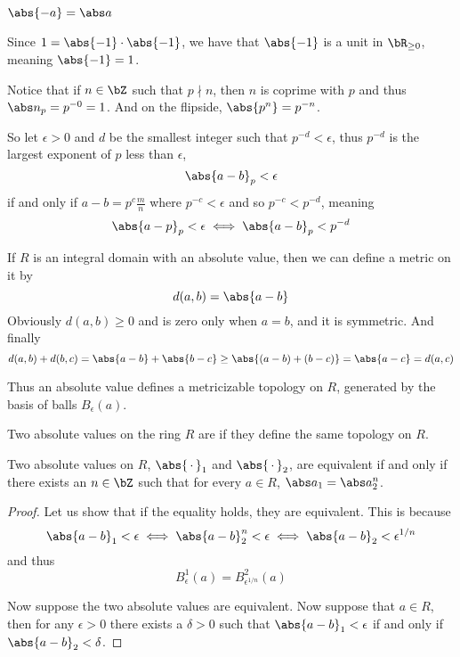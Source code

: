 \documentclass[10pt]{article}
\begin{document}
\begin{prop*}

    $\abs{-a}=\abs a$

\end{prop*}

Since $1=\abs{-1}\cdot\abs{-1}$, we have that $\abs{-1}$ is a unit in $\bR_{\geq0}$, meaning $\abs{-1}=1$.

Notice that if $n\in\bZ$ such that $p\nmid n$, then $n$ is coprime with $p$ and thus $\abs n_p=p^{-0}=1$.
And on the flipside, $\abs{p^n} = p^{-n}$.

So let $\epsilon>0$ and $d$ be the smallest integer such that $p^{-d}<\epsilon$, thus $p^{-d}$ is the largest exponent of $p$ less than $\epsilon$,
\[ \abs{a-b}_p < \epsilon \]
if and only if $a-b=p^c\frac mn$ where $p^{-c}<\epsilon$ and so $p^{-c}<p^{-d}$, meaning
\[ \abs{a-p}_p < \epsilon \iff \abs{a-b}_p < p^{-d} \]

\begin{note*}

    If $R$ is an integral domain with an absolute value, then we can define a metric on it by
    \[ d(a,b) = \abs{a-b} \]
    Obviously $d(a,b)\geq0$ and is zero only when $a=b$, and it is symmetric.
    And finally
    \[ d(a,b) + d(b,c) = \abs{a-b} + \abs{b-c} \geq \abs{(a-b)+(b-c)} = \abs{a-c} = d(a,c) \]

    Thus an absolute value defines a metricizable topology on $R$, generated by the basis of balls $B_\epsilon(a)$.

\end{note*}

\begin{defn*}

    Two absolute values on the ring $R$ are  if they define the same topology on $R$.

\end{defn*}

\begin{prop*}

    Two absolute values on $R$, $\abs{\,\cdot\,}_1$ and $\abs{\,\cdot\,}_2$, are equivalent if and only if there exists an $n\in\bZ$ such that for every $a\in R$, $\abs a_1=\abs a_2^n$.

\end{prop*}

\begin{proof}

    Let us show that if the equality holds, they are equivalent.
    This is because
    \[ \abs{a-b}_1 < \epsilon \iff \abs{a-b}_2^n < \epsilon \iff \abs{a-b}_2 < \epsilon^{1/n} \]
    and thus
    \[ B_\epsilon^1(a) = B_{\epsilon^{1/n}}^2(a) \]

    Now suppose the two absolute values are equivalent.
    Now suppose that $a\in R$, then for any $\epsilon>0$ there exists a $\delta>0$ such that $\abs{a-b}_1<\epsilon$ if and only if $\abs{a-b}_2<\delta$.

\end{proof}
\end{document}

